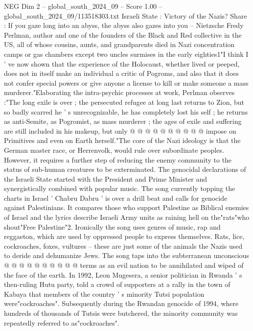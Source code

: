 \begin{textsample}{NEG Dim 2 – global\_south\_2024\_09 – Score 1.00 – global\_south\_2024\_09/113518303.txt}  \label{ex:f2_neg_412}
Israeli State : Victory of the Nazis?
Share : If you gaze long into an abyss, the abyss also gazes into you -- Nietzsche Fredy Perlman, author and one of the founders of the Black and Red collective in the US, all of whose cousins, aunts, and grandparents died in Nazi concentration camps or gas chambers except two uncles surmises in the early eighties1"I think I ' ve now shown that the experience of the Holocaust, whether lived or peeped, does not in itself make an individual a critic of Pogroms, and also that it does not confer special powers or give anyone a license to kill or make someone a mass murderer."Elaborating the intra-psychic processes at work, Perlman observes :"The long exile is over ; the persecuted refugee at long last returns to Zion, but so badly scarred he ' s unrecognizable, he has completely lost his self ; he returns as anti-Semite, as Pogromist, as mass murderer ; the ages of exile and suffering are still included in his makeup, but only @ @ @ @ @ @ @ @ @ @ impose on Primitives and even on Earth herself."The core of the Nazi ideology is that the German master race, or Herrenvolk, would rule over subordinate peoples.
However, it requires a further step of reducing the enemy community to the status of sub-human creatures to be exterminated.
The genocidal declarations of the Israeli State started with the President and Prime Minister and synergistically combined with popular music.
The song currently topping the charts in Israel ' Chabru Dabru ' is over a drill beat and calls for genocide against Palestinians.
It compares those who support Palestine as Biblical enemies of Israel and the lyrics describe Israeli Army units as raining hell on the"rats"who shout"Free Palestine"2.
Ironically the song uses genres of music, rap and reggaeton, which are used by oppressed people to express themselves.
Rats, lice, cockroaches, foxes, vultures -- these are just some of the animals the Nazis used to deride and dehumanize Jews.
The song taps into the subterranean unconscious @ @ @ @ @ @ @ @ @ @ terms as an evil nation to be annihilated and wiped of the face of the earth.
In 1992, Leon Mugesera, a senior politician in Rwanda ' s then-ruling Hutu party, told a crowd of supporters at a rally in the town of Kabaya that members of the country ' s minority Tutsi population were"cockroaches".
Subsequently during the Rwandan genocide of 1994, where hundreds of thousands of Tutsis were butchered, the minority community was repeatedly referred to as"cockroaches".

\end{textsample}
